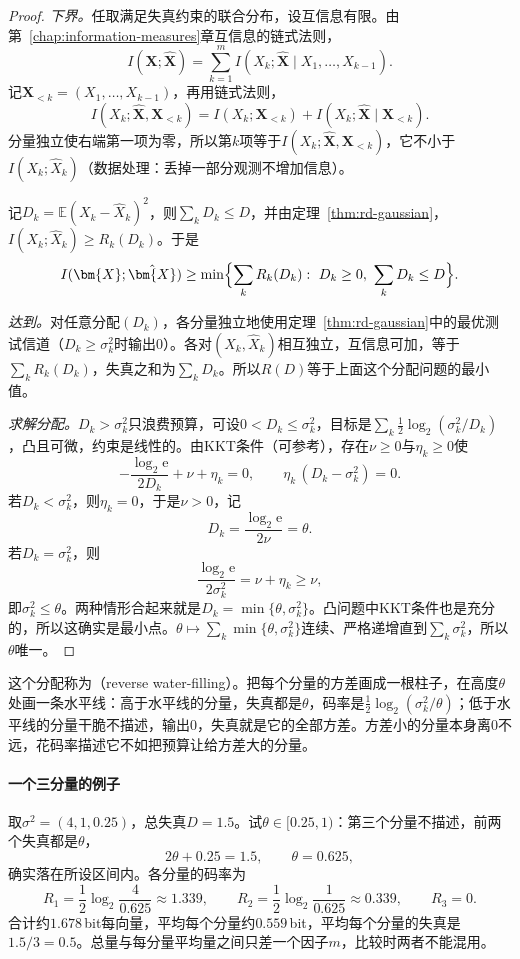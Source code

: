 \begin{proof}
\emph{下界。}任取满足失真约束的联合分布，设互信息有限。由第~\ref{chap:information-measures}章互信息的链式法则，
\[
  I(\bm{X};\hat{\bm{X}})=\sum_{k=1}^{m}I(X_k;\hat{\bm{X}}\mid X_1,\dots,X_{k-1}).
\]
记$\bm{X}_{<k}=(X_1,\dots,X_{k-1})$，再用链式法则，
\[
  I(X_k;\hat{\bm{X}},\bm{X}_{<k})=I(X_k;\bm{X}_{<k})+I(X_k;\hat{\bm{X}}\mid\bm{X}_{<k}).
\]
分量独立使右端第一项为零，所以第$k$项等于$I(X_k;\hat{\bm{X}},\bm{X}_{<k})$，它不小于$I(X_k;\hat{X}_k)$（数据处理：丢掉一部分观测不增加信息）。

记$D_k=\mathbb{E}(X_k-\hat{X}_k)^{2}$，则$\sum_kD_k\leq D$，并由定理~\ref{thm:rd-gaussian}，$I(X_k;\hat{X}_k)\geq R_k(D_k)$。于是
\[
  I(\bm{X};\hat{\bm{X}})\geq\min\Bigl\{\sum_kR_k(D_k):\ D_k\geq0,\ \sum_kD_k\leq D\Bigr\}.
\]

\emph{达到。}对任意分配$(D_k)$，各分量独立地使用定理~\ref{thm:rd-gaussian}中的最优测试信道（$D_k\geq\sigma_k^{2}$时输出$0$）。各对$(X_k,\hat{X}_k)$相互独立，互信息可加，等于$\sum_kR_k(D_k)$，失真之和为$\sum_kD_k$。所以$R(D)$等于上面这个分配问题的最小值。

\emph{求解分配。}$D_k>\sigma_k^{2}$只浪费预算，可设$0<D_k\leq\sigma_k^{2}$，目标是$\sum_k\frac12\log_2(\sigma_k^{2}/D_k)$，凸且可微，约束是线性的。由KKT条件（可参考），存在$\nu\geq0$与$\eta_k\geq0$使
\[
  -\frac{\log_2\mathrm{e}}{2D_k}+\nu+\eta_k=0,\qquad \eta_k\,(D_k-\sigma_k^{2})=0 .
\]
若$D_k<\sigma_k^{2}$，则$\eta_k=0$，于是$\nu>0$，记
\[
  D_k=\frac{\log_2\mathrm{e}}{2\nu}=\theta .
\]
若$D_k=\sigma_k^{2}$，则
\[
  \frac{\log_2\mathrm{e}}{2\sigma_k^{2}}=\nu+\eta_k\geq\nu,
\]
即$\sigma_k^{2}\leq\theta$。两种情形合起来就是$D_k=\min\{\theta,\sigma_k^{2}\}$。凸问题中KKT条件也是充分的，所以这确实是最小点。$\theta\mapsto\sum_k\min\{\theta,\sigma_k^{2}\}$连续、严格递增直到$\sum_k\sigma_k^{2}$，所以$\theta$唯一。
\end{proof}

这个分配称为（reverse water-filling）。把每个分量的方差画成一根柱子，在高度$\theta$处画一条水平线：高于水平线的分量，失真都是$\theta$，码率是$\frac12\log_2(\sigma_k^{2}/\theta)$；低于水平线的分量干脆不描述，输出$0$，失真就是它的全部方差。方差小的分量本身离$0$不远，花码率描述它不如把预算让给方差大的分量。

\paragraph{一个三分量的例子}
取$\sigma^{2}=(4,1,0.25)$，总失真$D=1.5$。试$\theta\in[0.25,1)$：第三个分量不描述，前两个失真都是$\theta$，
\[
  2\theta+0.25=1.5,\qquad \theta=0.625 ,
\]
确实落在所设区间内。各分量的码率为
\[
  R_1=\frac12\log_2\frac{4}{0.625}\approx1.339,\qquad
  R_2=\frac12\log_2\frac{1}{0.625}\approx0.339,\qquad R_3=0 .
\]
合计约$1.678$\,bit每向量，平均每个分量约$0.559$\,bit，平均每个分量的失真是$1.5/3=0.5$。总量与每分量平均量之间只差一个因子$m$，比较时两者不能混用。

